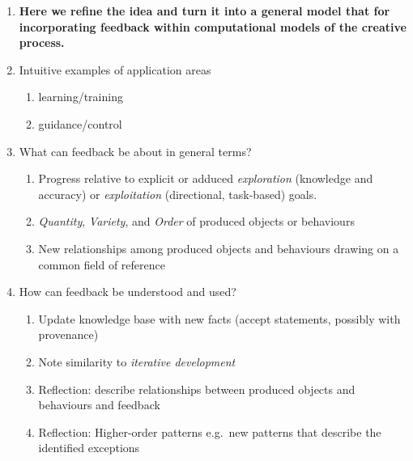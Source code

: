 \begin{enumerate}[start=2]
\item \textbf{Here we refine the idea and turn it into a general model
  that for incorporating feedback within computational models of the
  creative process.}
\item[] Intuitive examples of application areas
\begin{enumerate}
\item learning/training
\item guidance/control
\end{enumerate}
\item[] What can feedback be about in general terms? 
\begin{enumerate}
\item Progress relative to explicit or adduced \emph{exploration}
  (knowledge and accuracy) or \emph{exploitation} (directional,
  task-based) goals.
\item \emph{Quantity}, \emph{Variety}, and \emph{Order} of produced
  objects or behaviours
\item New relationships among produced objects and behaviours drawing
  on a common field of reference
\end{enumerate}
\item[] How can feedback be understood and used? 
\begin{enumerate}
\item Update knowledge base with new facts (accept statements,
  possibly with provenance)
\item Note similarity to \emph{iterative development}
\item Reflection: describe relationships between produced objects and
  behaviours and feedback
\item Reflection: Higher-order patterns e.g.~new patterns that
  describe the identified exceptions
\end{enumerate}
\end{enumerate}

